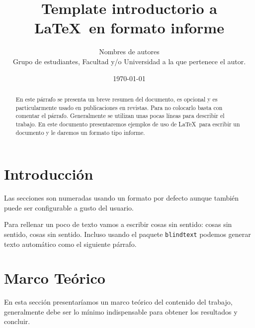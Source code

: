 \documentclass[a4paper,11pt]{article}
\title{Template introductorio a \LaTeX ~en formato informe} %
\author{%
  Nombres de autores\\ %
  Grupo de estudiantes, Facultad y/o Universidad a la que pertenece el autor.}
\date{\today}
\newcommand{\subfigureautorefname}{\figureautorefname}
\begin{document}
	
\renewcommand{\tablename}{\bfseries Tabla} %
\renewcommand{\figurename}{\bfseries Figura} %
%
\maketitle


\begin{abstract}
En este párrafo se presenta un breve resumen del documento, es opcional y es particularmente usado en publicaciones en revistas. Para no colocarlo basta con comentar el párrafo. %
Generalmente se utilizan unas pocas líneas para describir el trabajo. %
En este documento presentaremos ejemplos de uso de \LaTeX~para escribir un documento y le daremos un formato tipo informe.
\end{abstract}

\tableofcontents

\newpage


\section{Introducción}
%
Las secciones son numeradas usando un formato por defecto aunque también puede ser configurable a gusto del usuario.

Para rellenar un poco de texto vamos a escribir cosas sin sentido: cosas sin sentido, cosas sin sentido. Incluso usando el paquete \verb+blindtext+ podemos generar texto automático como el siguiente párrafo.

\blindtext

\section{Marco Teórico}
%
En esta sección presentaríamos un marco teórico del contenido del trabajo, generalmente debe ser lo mínimo indispensable para obtener los resultados y concluir.
\end{document}
